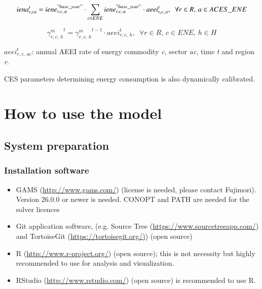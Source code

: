 \documentclass[10pt,a4paper,titlepage,dvipdfmx]{book}
\begin{document}
\begin{equation}
\label{equ:eneinp2}
iena_{r,ca}^{t}=iene_{r,c,\,a}^{"base\_ year"}\cdot \sum _{c\in ENE}iene_{r,c,\,a}^{"base\_ year"}\cdot aeei_{r,c,\,a}^{t},\,\,\,\forall r\in R,\,a\in ACES\_ ENE \\
\end{equation}

\begin{equation}
\label{equ:eneinp3}
{\gamma^{m}_{r,c,\,h}}^{t} = {\gamma^{m}_{r,c,\,h}}^{t-1}\cdot aeei_{r,c,\,h}^{t},\,\,\,\forall r\in R,\,c\in ENE,\,h\in H 
\end{equation}

\begin{flushleft} $aeei_{r,c,\,ac}^{t}$: annual AEEI rate of energy commodity \textit{c}, sector \textit{ac}, time \textit{t} and region \textit{r}. \end{flushleft}

CES parameters determining energy consumption is also dynamically calibrated.

\chapter{\label{chp:HowtoUse}How to use the model}

\section{\label{sec:StsPre}System preparation}

\subsection{\label{subsec:InsSof}Installation software}


\begin{itemize}
\item GAMS (\url{http://www.gams.com/}) (license is needed, please contact Fujimori). Version 26.0.0 or newer is needed. CONOPT and PATH are needed for the solver licences  
\item Git application software, (e.g. Source Tree (\url{https://www.sourcetreeapp.com/}) and TortoiseGit (\url{https://tortoisegit.org/)})  (open source)
\item R (\url{http://www.r-project.org/}) (open source); this is not necessity but highly recommended to use for analysis and visualization.
\item RStudio (\url{http://www.rstudio.com/}) (open source) is recommended to use R.
\end{itemize}
\end{document}
